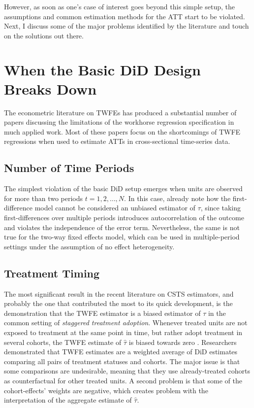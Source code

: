 \documentclass[hidelinks]{article}\usepackage[]{graphicx}\usepackage[]{color}
\begin{document}
However, as soon as one's case of interest goes beyond this simple setup, the assumptions and common estimation methods for the ATT start to be violated. Next, I discuss some of the major problems identified by the literature and touch on the solutions out there.

\section{When the Basic DiD Design Breaks Down}

The econometric literature on TWFEs has produced a substantial number of papers discussing the limitations of the workhorse regression specification in much applied work. Most of these papers focus on the shortcomings of TWFE regressions when used to estimate ATTs in cross-sectional time-series data.

\subsection{Number of Time Periods}

The simplest violation of the basic DiD setup emerges when units are observed for more than two periods $t=1, 2, \dots, N$. In this case, \textcite{Angrist2009} already note how the first-difference model cannot be considered an unbiased estimator of $\tau$, since taking first-differences over multiple periods introduces autocorrelation of the outcome and violates the independence of the error term. Nevertheless, the same is not true for the two-way fixed effects model, which can be used in multiple-period settings under the assumption of no effect heterogeneity.

\subsection{Treatment Timing}

The most significant result in the recent literature on CSTS estimators, and probably the one that contributed the most to its quick development, is the demonstration that the TWFE estimator is a biased estimator of $\tau$ in the common setting of \textit{staggered treatment adoption}. Whenever treated units are not exposed to treatment at the same point in time, but rather adopt treatment in several cohorts, the TWFE estimate of $\hat{\tau}$ is biased towards zero \parencite{GoodmanBacon2021, Callaway2021}. Researchers demonstrated that TWFE estimates are a weighted average of DiD estimates comparing all pairs of treatment statuses and cohorts. The major issue is that some comparisons are undesirable, meaning that they use already-treated cohorts as counterfactual for other treated units. A second problem is that some of the cohort-effects' weights are negative, which creates problem with the interpretation of the aggregate estimate of $\hat{\tau}$. 
\end{document}
